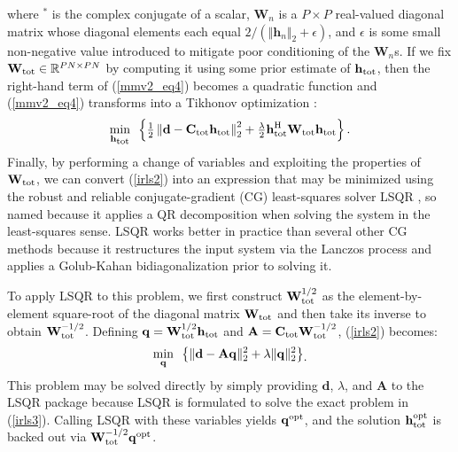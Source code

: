 \documentclass[final]{siamltex}
\newcommand{\field}[1]{\mathbb{#1}}
\newcommand{\la}[1]{\mbox{$\mathbf{#1}$}}  \newcommand{\sst}[1]{\mbox{\scriptsize{#1}}}
\newcommand{\Frac}[2]{{{#1}/{#2}}}
\begin{document}
    where $^{\ast}$ is the complex conjugate of a scalar, $\la{W}_n$
    is a $P \times P$ real-valued diagonal matrix whose diagonal
    elements each equal $2 / (\Vert \la{h}_n \Vert_2 + \epsilon)$,
    and $\epsilon$ is some small non-negative value introduced to
    mitigate poor conditioning of the $\la{W}_n$s.  If we fix
    $\la{W}_{\sst{tot}} \in \field{R}^{PN \times PN}$ by computing it
    using some prior estimate of $\la{h}_{\sst{tot}}$, then the
    right-hand term of (\ref{mmv2_eq4}) becomes a quadratic function
    and (\ref{mmv2_eq4}) transforms into a Tikhonov optimization
    \cite{Tik1963, Tik1977}:
    \begin{equation}\label{irls2}
    \mathop{\mbox{min}}_{\mbox{\scriptsize{$\la{h}_{\sst{tot}}$}}}
    \mbox{  }
       \left \{
         \tfrac{1}{2}  \left \Vert \la{d} -
                       \la{C}_{\mbox{\scriptsize{tot}}}
                       \la{h}_{\mbox{\scriptsize{tot}}}
                       \right \Vert_2^2
        +      \tfrac{\lambda}{2}  \la{h}_{\sst{tot}}^{\sst{H}} \la{W}_{\sst{tot}} \la{h}_{\sst{tot}}
       \right \}.
    \end{equation}
    Finally, by performing a change of variables and exploiting the
    properties of $\la{W}_{\sst{tot}}$, we can convert (\ref{irls2})
    into an expression that may be minimized using the robust and
    reliable conjugate-gradient (CG) least-squares solver LSQR
    \cite{LSQR1:82, LSQR2:82}, so named because it applies a QR decomposition
    \cite{Gol1983} when solving the system in the least-squares sense.  LSQR works better in
    practice than several other CG methods \cite{Bjo1978} because it
    restructures the input system via the Lanczos process
    \cite{Lan1950} and applies a Golub-Kahan bidiagonalization \cite{Gol1965}
    prior to solving it.

    To apply LSQR to this problem, we first construct
    $\la{W}_{\sst{tot}}^{\Frac{1}{2}}$ as the element-by-element
    square-root of the diagonal matrix $\la{W}_{\sst{tot}}$ and then
    take its inverse to obtain $\la{W}_{\sst{tot}}^{-\Frac{1}{2}}$.
    Defining $\la{q} = \la{W}_{\sst{tot}}^{\Frac{1}{2}}
    \la{h}_{\sst{tot}}$ and $\la{A} = \la{C}_{\mbox{\scriptsize{tot}}}
    \la{W}_{\sst{tot}}^{-\Frac{1}{2}}$, (\ref{irls2}) becomes:
    \begin{equation}\label{irls3}
    \begin{split}
      \mathop{\mbox{min}}_{\mbox{\scriptsize{$\la{q}$}}}
      \mbox{  }
       \left \{
                \Vert \la{d} - \la{A} \la{q} \Vert_2^2
        +      \lambda \Vert \la{q} \Vert_2^2
       \right \}\\
    \end{split}.
    \end{equation}
    This problem may be solved directly by simply providing $\la{d}$,
    $\lambda$, and $\la{A}$ to the LSQR package because LSQR is
    formulated to solve the exact problem in (\ref{irls3}).  Calling
    LSQR with these variables yields $\la{q}^{\sst{opt}}$, and the
    solution $\la{h}_{\sst{tot}}^{\sst{opt}}$ is backed out via
    $\la{W}_{\sst{tot}}^{-\Frac{1}{2}} \la{q}^{\sst{opt}}$.
\end{document}
